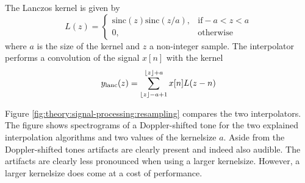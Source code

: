 The Lanczos kernel is given by
\begin{equation}
 L(z) = \begin{cases}
         \textrm{sinc}(z) \textrm{sinc}(z/a), & \textrm{if} -a < z < a \\
         0, & \text{otherwise}
        \end{cases}
\end{equation}
where $a$ is the size of the kernel and $z$ a non-integer sample.
The interpolator performs a convolution of the signal $x[n]$ with the kernel
\begin{equation}
 y_{\mathrm{lanc}}(z) = \sum_{\lfloor z\rfloor - a + 1}^{\lfloor z\rfloor + a} x[n] L(z-n)
\end{equation}

Figure \ref{fig:theory:signal-processing:resampling} compares the two
interpolators. The figure shows spectrograms of a Doppler-shifted tone for the
two explained interpolation algorithms and two values of the kernelsize $a$.
Aside from the Doppler-shifted tones artifacts are clearly present and indeed
also audible. The artifacts are clearly less pronounced when using a larger
kernelsize. However, a larger kernelsize does come at a cost of performance.



%



